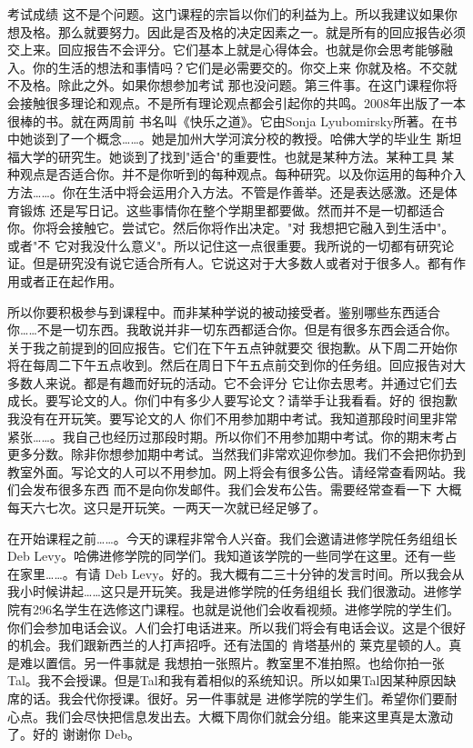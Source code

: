 考试成绩 这不是个问题。这门课程的宗旨以你们的利益为上。所以我建议如果你想及格。那么就要努力。因此是否及格的决定因素之一。就是所有的回应报告必须交上来。回应报告不会评分。它们基本上就是心得体会。也就是你会思考能够融入。你的生活的想法和事情吗？它们是必需要交的。你交上来 你就及格。不交就不及格。除此之外。如果你想参加考试 那也没问题。第三件事。在这门课程你将会接触很多理论和观点。不是所有理论观点都会引起你的共鸣。2008年出版了一本很棒的书。就在两周前 书名叫《快乐之道》。它由Sonja Lyubomirsky所著。在书中她谈到了一个概念……。她是加州大学河滨分校的教授。哈佛大学的毕业生 斯坦福大学的研究生。她谈到了找到"适合"的重要性。也就是某种方法。某种工具 某种观点是否适合你。并不是你听到的每种观点。每种研究。以及你运用的每种介入方法……。你在生活中将会运用介入方法。不管是作善举。还是表达感激。还是体育锻炼 还是写日记。这些事情你在整个学期里都要做。然而并不是一切都适合你。你将会接触它。尝试它。然后你将作出决定。"对 我想把它融入到生活中"。或者"不 它对我没什么意义"。所以记住这一点很重要。我所说的一切都有研究论证。但是研究没有说它适合所有人。它说这对于大多数人或者对于很多人。都有作用或者正在起作用。 

所以你要积极参与到课程中。而非某种学说的被动接受者。鉴别哪些东西适合你……不是一切东西。我敢说并非一切东西都适合你。但是有很多东西会适合你。关于我之前提到的回应报告。它们在下午五点钟就要交 很抱歉。从下周二开始你将在每周二下午五点收到。然后在周日下午五点前交到你的任务组。回应报告对大多数人来说。都是有趣而好玩的活动。它不会评分 它让你去思考。并通过它们去成长。要写论文的人。你们中有多少人要写论文？请举手让我看看。好的 很抱歉 我没有在开玩笑。要写论文的人 你们不用参加期中考试。我知道那段时间里非常紧张……。我自己也经历过那段时期。所以你们不用参加期中考试。你的期末考占更多分数。除非你想参加期中考试。当然我们非常欢迎你参加。我们不会把你扔到教室外面。写论文的人可以不用参加。网上将会有很多公告。请经常查看网站。我们会发布很多东西 而不是向你发邮件。我们会发布公告。需要经常查看一下 大概每天六七次。这只是开玩笑。一两天一次就已经足够了。 

在开始课程之前……。今天的课程非常令人兴奋。我们会邀请进修学院任务组组长Deb Levy。哈佛进修学院的同学们。我知道该学院的一些同学在这里。还有一些在家里……。有请 Deb Levy。好的。我大概有二三十分钟的发言时间。所以我会从我小时候讲起……这只是开玩笑。我是进修学院的任务组组长 我们很激动。进修学院有296名学生在选修这门课程。也就是说他们会收看视频。进修学院的学生们。你们会参加电话会议。人们会打电话进来。所以我们将会有电话会议。这是个很好的机会。我们跟新西兰的人打声招呼。还有法国的 肯塔基州的 莱克星顿的人。真是难以置信。另一件事就是 我想拍一张照片。教室里不准拍照。也给你拍一张 Tal。我不会授课。但是Tal和我有着相似的系统知识。所以如果Tal因某种原因缺席的话。我会代你授课。很好。另一件事就是 进修学院的学生们。希望你们要耐心点。我们会尽快把信息发出去。大概下周你们就会分组。能来这里真是太激动了。好的 谢谢你 Deb。 

